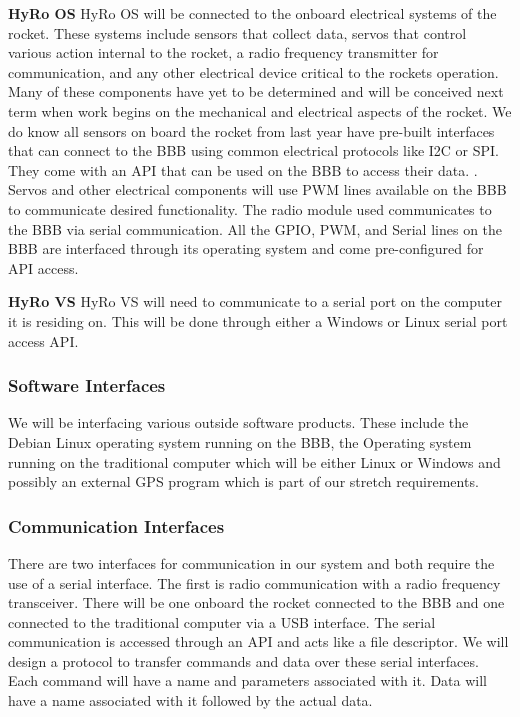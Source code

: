 \documentclass[10pt,draftclsnofoot,onecolumn,retainorgcmds]{IEEEtran}
\begin{document}
{\bf HyRo OS}
HyRo OS will be connected to the onboard electrical systems of the rocket. These systems include sensors that collect data, servos that control various action internal to the rocket, a radio frequency transmitter for communication, and any other electrical device critical to the rockets operation. Many of these components have yet to be determined and will be conceived next term when work begins on the mechanical and electrical aspects of the rocket.  We do know all sensors on board the rocket from last year have pre-built interfaces that can connect to the BBB using common electrical protocols like I2C or SPI. They come with an API that can be used on the BBB to access their data. . Servos and other electrical components will use PWM lines available on the BBB to communicate desired functionality. The radio module used communicates to the BBB via serial communication. All the GPIO, PWM, and Serial lines on the BBB are interfaced through its operating system and come pre-configured for API access.\par

{\bf HyRo VS}
HyRo VS will need to communicate to a serial port on the computer it is residing on.  This will be done through either a Windows or Linux serial port access API.

\subsubsection{Software Interfaces}
We will be interfacing various outside software products. These include the Debian Linux operating system running on the BBB, the Operating system running on the traditional computer which will be either Linux or Windows and possibly an external GPS program which is part of our stretch requirements.

\subsubsection{Communication Interfaces}
There are two interfaces for communication in our system and both require the use of a serial interface. The first is radio communication with a radio frequency transceiver. There will be one onboard the rocket connected to the BBB and one connected to the traditional computer via a USB interface. The serial communication is accessed through an API and acts like a file descriptor. We will design a protocol to transfer commands and data over these serial interfaces. Each command will have a name and parameters associated with it. Data will have a name associated with it followed by the actual data.
\end{document}
